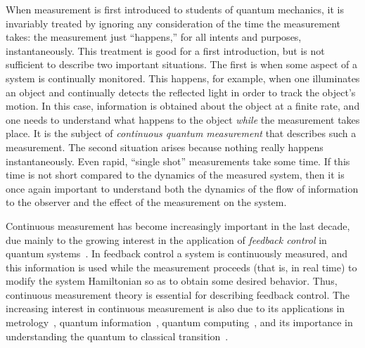 \documentclass[aps,twocolumn,superscriptaddress,footinbib,floatfix,showpacs]{revtex4}
\begin{document}
When measurement is first introduced to students of quantum mechanics,
it is invariably treated by ignoring any consideration of the time the measurement takes:
the measurement just ``happens,'' for all intents and purposes,
instantaneously.  This treatment is good for a first introduction, but
is not sufficient to describe two important situations.  The first is
when some aspect of a system is continually monitored.  
This happens, for example,
when one illuminates an object and continually detects the reflected
light in order to track the object's motion.  In this case, information
is obtained about the object at a finite rate, and one needs to
understand what happens to the object {\em while} the measurement
takes place.  It is the subject of {\em continuous quantum
measurement} that describes such a measurement.  The second situation
arises because nothing really happens instantaneously.  Even
rapid, ``single shot'' measurements take some time.  If this time is
not short compared to the dynamics of the measured system, then it is
once again important to understand both the dynamics of the flow of
information to the observer and the effect of the measurement on the
system.

Continuous measurement has become increasingly important in the last
decade, due mainly to the growing interest in the application of
\textit{feedback control} in quantum
systems~\cite{BelavkinLQG,DJ,Wiseman05,Hopkins03,Steck04,Steixner05,Rabl05,Combes06,Bushev06,DHelon06,Steck06}.  
In feedback control a system is
continuously measured, and this information is used while the
measurement proceeds (that is, in real time) to modify the system
Hamiltonian so as to obtain some desired behavior.  Thus, continuous
measurement theory is essential for describing feedback control.  The
increasing interest in continuous measurement is also due to its
applications in metrology~\cite{Wiseman95,Berry02,Pope04,Stockton04,Geremia05},
quantum information~\cite{Dolinar73,Geremia04,Jacobs07}, quantum
computing~\cite{Ahn02,Sarovar04,Handel06}, and its importance in
understanding the quantum to classical
transition~\cite{Bhattacharya00,Habib02,Bhattacharya03,Ghose04,Ghose05,Everitt05,Habib06}.
\end{document}
